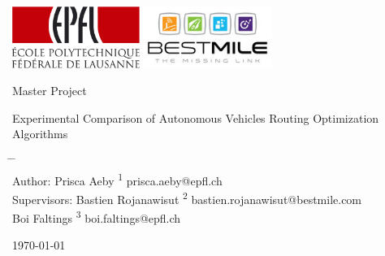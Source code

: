 \documentclass[12pt,a4paper]{article}
\begin{document}
\thispagestyle{empty}

  \vspace{-3cm}
  \includegraphics[height=2cm]{./images/EPFL.pdf}
  \hfill \includegraphics[height=2cm]{./images/bestmile.jpg}
  
  \hrulefill
  \vspace{3.0cm}

\begin{center}
 Master Project 
 \LARGE
 \bigskip
 
 Experimental Comparison of Autonomous Vehicles Routing Optimization Algorithms
\end{center}



\vspace{2.0cm}
\begin{tabbing}
\hspace*{3cm}		\=	\hspace*{5cm}							\=	\hspace*{3cm} \\
Author:			\>	Prisca Aeby		  \textsuperscript{1}	\> prisca.aeby@epfl.ch\\
Supervisors:		\>	Bastien Rojanawisut	  \textsuperscript{2}	\> bastien.rojanawisut@bestmile.com\\	
					\>	Boi Faltings    \textsuperscript{3}	\> boi.faltings@epfl.ch\\
\end{tabbing}



\begin{center}

\today
\end{center}

\vfill
\hrulefill
\end{document}

